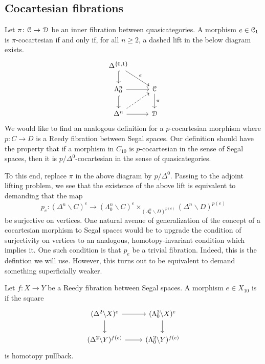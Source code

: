 \documentclass[main.tex]{subfiles}
\begin{document}
\subsection{Cocartesian fibrations}
\label{ssc:cocartesian_fibrations}

Let $\pi\colon \mathcal{C} \to \mathcal{D}$ be an inner fibration between quasicategories. A morphism $e \in \mathcal{C}_{1}$ is $\pi$-cocartesian if and only if, for all $n \geq 2$, a dashed lift in the below diagram exists.
\begin{equation*}
  \begin{tikzcd}
    \Delta^{\{0, 1\}}
    \arrow[d, hook]
    \arrow[dr, "e"]
    \\
    \Lambda^{n}_{0}
    \arrow[r]
    \arrow[d, hook]
    & \category{C}
    \arrow[d, "\pi"]
    \\
    \Delta^{n}
    \arrow[r]
    \arrow[ur, dashed]
    & \category{D}
  \end{tikzcd}
\end{equation*}
We would like to find an analogous definition for a $p$-cocartesian morphism where $p\colon C \to D$ is a Reedy fibration between Segal spaces. Our definition should have the property that if a morphism in $C_{10}$ is $p$-cocartesian in the sense of Segal spaces, then it is $p / \Delta^{0}$-cocartesian in the sense of quasicategories.

To this end, replace $\pi$ in the above diagram by $p / \Delta^{0}$. Passing to the adjoint lifting problem, we see that the existence of the above lift is equivalent to demanding that the map
\begin{equation}
  p_{e}\colon (\Delta^{n} \backslash C)^{e} \to (\Lambda^{n}_{0} \backslash C)^{e} \times_{(\Lambda^{n}_{0} \backslash D)^{p(e)}} (\Delta^{n} \backslash D)^{p(e)}
\end{equation}
be surjective on vertices. One natural avenue of generalization of the concept of a cocartesian morphism to Segal spaces would be to upgrade the condition of surjectivity on vertices to an analogous, homotopy-invariant condition which implies it. One such condition is that $p_{e}$ be a trivial fibration. Indeed, this is the defintion we will use. However, this turns out to be equivalent to demand something superficially weaker.

\begin{definition}
  \label{def:cocartesian_morphism}
  Let $f\colon X \to Y$ be a Reedy fibration between Segal spaces. A morphism $e \in X_{10}$ is  if the square
  \begin{equation*}
    \begin{tikzcd}
      (\Delta^{2} \backslash X)^{e}
      \arrow[r]
      \arrow[d]
      & (\Lambda^{2}_{0} \backslash X)^{e}
      \arrow[d]
      \\
      (\Delta^{2} \backslash Y)^{f(e)}
      \arrow[r]
      & (\Lambda^{2}_{0} \backslash Y)^{f(e)}
    \end{tikzcd}
  \end{equation*}
  is homotopy pullback.
\end{definition}
\end{document}
